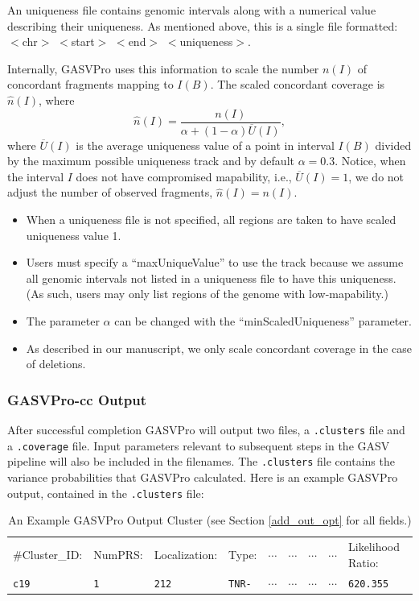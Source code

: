 \documentclass[11pt]{article}
\begin{document}
An uniqueness file contains genomic intervals along with a numerical value describing their uniqueness. As mentioned above, this is a single file formatted: $<$chr$>$ $<$start$>$ $<$end$>$ $<$uniqueness$>$. 

Internally, GASVPro uses this information to scale the number $n(I)$ of concordant fragments mapping to $I(B)$. The scaled  concordant coverage is $\hat{n}(I)$, where
\begin{equation}
\hat{n}(I)= \frac{n(I)}{\alpha + (1-\alpha) \overline{U}(I)},
\end{equation}
\noindent where $\overline{U}(I)$ is the average uniqueness value of a point in interval $I(B)$ divided by the maximum possible uniqueness track and by default  $\alpha = 0.3$. Notice, when the interval $I$ does not have compromised mapability, i.e., $\overline{U}(I) = 1$, we do not adjust the number of observed fragments, $\hat{n}(I) = n(I)$.

\begin{itemize}
\item When a uniqueness file is not specified, all regions are taken to have scaled uniqueness value 1.
\item Users must specify a ``maxUniqueValue'' to use the track because we assume all genomic intervals not listed in a uniqueness file to have this uniqueness. (As such, users may only list regions of the genome with low-mapability.)
\item The parameter $\alpha$ can be changed with the ``minScaledUniqueness'' parameter.
\item As described in our manuscript, we only scale concordant coverage in the case of deletions.  
\end{itemize}


\subsubsection{GASVPro-cc Output}
After successful completion GASVPro will output two files, a \verb+.clusters+ file and a \verb+.coverage+ file. Input parameters relevant to subsequent steps in the GASV pipeline will also be included in the filenames. The \verb+.clusters+ file contains the variance probabilities that GASVPro calculated. Here is an example GASVPro output, contained in the \verb+.clusters+ file:
\begin{table}[h]\small
   \centering
   \begin{tabular}{lllllllll} %
 \#Cluster\_ID:  &  NumPRS:   &  Localization: & Type:  &  $\cdots$    &     $\cdots$  & $\cdots$  &  $\cdots$ & Likelihood Ratio:\\
		\verb+c19+  &  \verb+1+  &    \verb+212+   &    \verb+TNR-+     & $\cdots$   &    $\cdots$  &     $\cdots$&    $\cdots$ & \verb+620.355+
    \end{tabular}
   \caption{An Example GASVPro Output Cluster (see Section \ref{add_out_opt} for all fields.)}
   \label{tab:booktabs}
\end{table}
\end{document}
